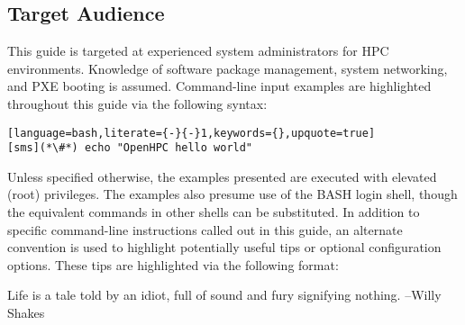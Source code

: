 \subsection{Target Audience}

This guide is targeted at experienced \Linux{} system administrators for HPC
environments. Knowledge of software package management, system networking, and
PXE booting is assumed. Command-line input examples are highlighted throughout
this guide via the following syntax:

\begin{lstlisting}[language=bash,literate={-}{-}1,keywords={},upquote=true]
[sms](*\#*) echo "OpenHPC hello world"
\end{lstlisting}

Unless specified otherwise, the examples presented are executed with
elevated (root) privileges. The examples also presume use of the BASH login
shell, though the equivalent commands in other shells can be substituted.
In addition to specific command-line instructions called out in this guide, an
alternate convention is used to highlight potentially useful tips or optional
configuration options. These tips are highlighted via the following format:

\begin{center}
\begin{tcolorbox}[]
\small  Life is a tale told by an idiot, full of sound and fury signifying nothing. --Willy Shakes
\end{tcolorbox}
\end{center}

